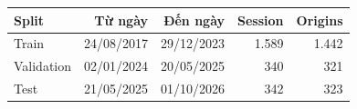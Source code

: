 \begin{tabular}{@{}lrrrr@{}}
\toprule
Split & Từ ngày & Đến ngày & Session & Origins \\
\midrule
Train & 24/08/2017 & 29/12/2023 & 1.589 & 1.442 \\
Validation & 02/01/2024 & 20/05/2025 & 340 & 321 \\
Test & 21/05/2025 & 01/10/2026 & 342 & 323 \\
\bottomrule
\end{tabular}
